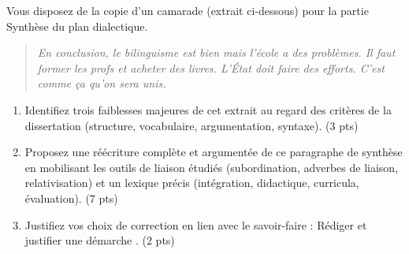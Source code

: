\documentclass[11pt]{article}
\begin{document}
\begin{exercice}
Vous disposez de la copie d'un camarade (extrait ci-dessous) pour la partie \og Synthèse \fg{} du plan dialectique.
\begin{quote}
\og \textit{En conclusion, le bilinguisme est bien mais l'école a des problèmes. Il faut former les profs et acheter des livres. L'État doit faire des efforts. C'est comme ça qu'on sera unis.}\fg{}
\end{quote}
\begin{enumerate}
    \item Identifiez trois faiblesses majeures de cet extrait au regard des critères de la dissertation (structure, vocabulaire, argumentation, syntaxe). (3 pts)
    \item Proposez une réécriture complète et argumentée de ce paragraphe de synthèse en mobilisant les outils de liaison étudiés (subordination, adverbes de liaison, relativisation) et un lexique précis (intégration, didactique, curricula, évaluation). (7 pts)
    \item Justifiez vos choix de correction en lien avec le savoir-faire : \og Rédiger et justifier une démarche \fg{}. (2 pts)
\end{enumerate}
\end{exercice}
\end{document}
